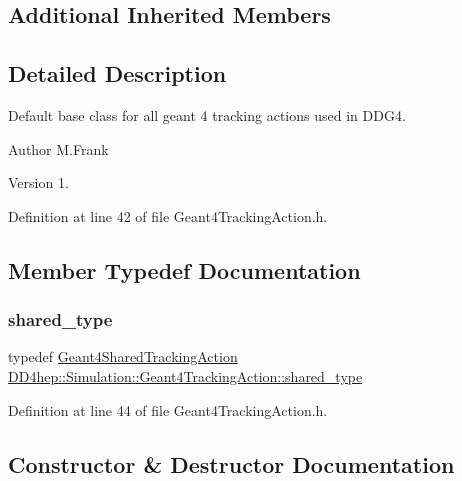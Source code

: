 \subsection*{Additional Inherited Members}


\subsection{Detailed Description}
Default base class for all geant 4 tracking actions used in D\+D\+G4. 

\begin{DoxyAuthor}{Author}
M.\+Frank 
\end{DoxyAuthor}
\begin{DoxyVersion}{Version}
1. 
\end{DoxyVersion}


Definition at line 42 of file Geant4\+Tracking\+Action.\+h.



\subsection{Member Typedef Documentation}
\hypertarget{class_d_d4hep_1_1_simulation_1_1_geant4_tracking_action_af42e74e119918be4046770f69c8c0266}{}\label{class_d_d4hep_1_1_simulation_1_1_geant4_tracking_action_af42e74e119918be4046770f69c8c0266} 
\subsubsection{\texorpdfstring{shared\+\_\+type}{shared\_type}}
{\footnotesize\ttfamily typedef \hyperlink{class_d_d4hep_1_1_simulation_1_1_geant4_shared_tracking_action}{Geant4\+Shared\+Tracking\+Action} \hyperlink{class_d_d4hep_1_1_simulation_1_1_geant4_tracking_action_af42e74e119918be4046770f69c8c0266}{D\+D4hep\+::\+Simulation\+::\+Geant4\+Tracking\+Action\+::shared\+\_\+type}}



Definition at line 44 of file Geant4\+Tracking\+Action.\+h.



\subsection{Constructor \& Destructor Documentation}
\hypertarget{class_d_d4hep_1_1_simulation_1_1_geant4_tracking_action_a880f505879b9b751f5757147b79823ce}{}\label{class_d_d4hep_1_1_simulation_1_1_geant4_tracking_action_a880f505879b9b751f5757147b79823ce} 
